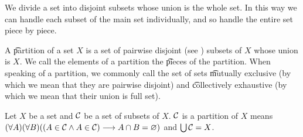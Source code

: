 

We divide a set into disjoint subsets whose union is the whole set.
In this way we can handle each subset of the main set individually, and so handle the entire set piece by piece.


A \t{partition} of a set $X$ is a set of pairwise disjoint (see ) subsets of $X$ whose union is $X$.
We call the elements of a  partition the \t{pieces} of the partition.
When speaking of a partition, we commonly call the set of sets \t{mutually exclusive} (by which we mean that they are pairwise disjoint) and \t{collectively exhaustive} (by which we mean that their union is full set).


Let $X$ be a set and $\mathcal{C}$ be a set of subsets of $X$.
$\mathcal{C}$ is a partition of $X$ means $(\forall A)(\forall B)((A \in \mathcal{C} \land A \in \mathcal{C}) \longrightarrow A \cap B = \varnothing)$ and $\bigcup \mathcal{C} = X$.

\blankpage
